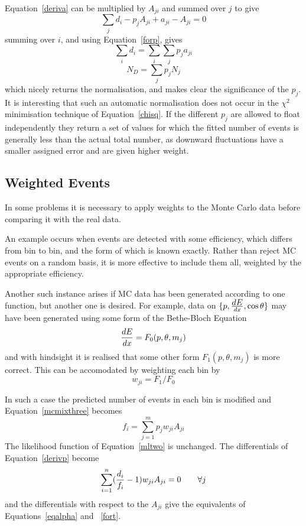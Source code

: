 Equation~\ref{deriva}
can be multiplied by $A_{ji}$ and summed over $j$
to give
\[
   \sum_j d_i -  p_j A_{ji}
    + a_{ji} - A_{ji}=0
\]
summing over $i$, and using Equation~\ref{forp}, gives
\[
    \sum_i d_i = \sum_i \sum_j p_j a_{ji}
\]
\begin{equation}
N_D = \sum_j p_j N_j \label{normal}
\end{equation}
which nicely returns the normalisation, and makes clear the
significance of the $p_j$.
It is interesting that such an automatic normalisation does not occur in
the $\chi^2$ minimisation technique of Equation~\ref{chisq}.
If the different $p_j$ are allowed to float independently they return
a set of values for which the
fitted number of events is generally less than the actual total number,
as downward fluctuations have a smaller assigned error and are given higher weight.
 
\subsection*{Weighted Events}
 
In some problems it is necessary to apply weights to the Monte Carlo data
before comparing it with the real data.
 
An example occurs when events are detected with some efficiency,
which differs from bin to bin, and
the form of which is known exactly.  Rather than reject MC events on a random
basis, it is more effective to include them all, weighted by the appropriate
efficiency.
 
Another such instance arises if MC  data has been generated
according to one function, but another one is desired.   For example, data
on $\{p, {\textstyle dE \over dx}, \cos\theta\}$ may have been generated using some
form of the Bethe-Bloch Equation
\[
   {dE \over dx} = F_0(p,\theta,m_j)
\]
and with hindsight it is realised that some other form $F_1(p,\theta,m_j)$
is more correct.   This can be accomodated by weighting each bin by
\[ w_{ji}=F_1 / F_0 \]
 
In such a case the predicted number of events in each bin is modified
and Equation~\ref{mcmixthree} becomes
\begin{equation}
f_i = \sum_{j=1}^m p_j w_{ji} A_{ji}\label{wmcmix}
\end{equation}
The likelihood function of Equation~\ref{mltwo} is unchanged. The
differentials of Equation~\ref{derivp} become
\begin{equation}
\sum_{i=1}^n ({d_i \over f_i} -1) w_{ji} A_{ji}=0\qquad \forall j
\label{wderivp}
\end{equation}
and the differentials with respect to the $A_{ji}$ give the
equivalents of Equations~\ref{eqalpha} and ~\ref{fort}.
 

